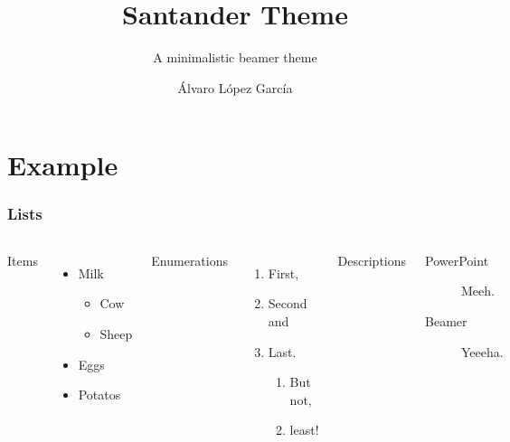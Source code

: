 \documentclass[11 pt,t]{beamer}
\author{{\'A}lvaro L{\'o}pez Garc{\'i}a}
\title{Santander Theme}
\subtitle{A minimalistic beamer theme}
\institute{Center for minimalistic beamer themes}
\begin{document}
\begin{frame}
    \titlepage
\end{frame}

\section{Example}

\begin{frame}
    \frametitle{Lists}
    \begin{columns}[T,onlytextwidth]
        Items
        \begin{itemize}
            \item Milk
                \begin{itemize}
                    \item Cow
                    \item Sheep
                \end{itemize}
            \item Eggs
            \item Potatos
        \end{itemize}

        Enumerations
        \begin{enumerate}
            \item First,
            \item Second and
            \item Last.
                \begin{enumerate}
                    \item But not,
                    \item least!
                \end{enumerate}
        \end{enumerate}

        Descriptions
        \begin{description}
            \item[PowerPoint] Meeh.
            \item[Beamer] Yeeeha.
        \end{description}
    \end{columns}
\end{frame}
\end{document}
